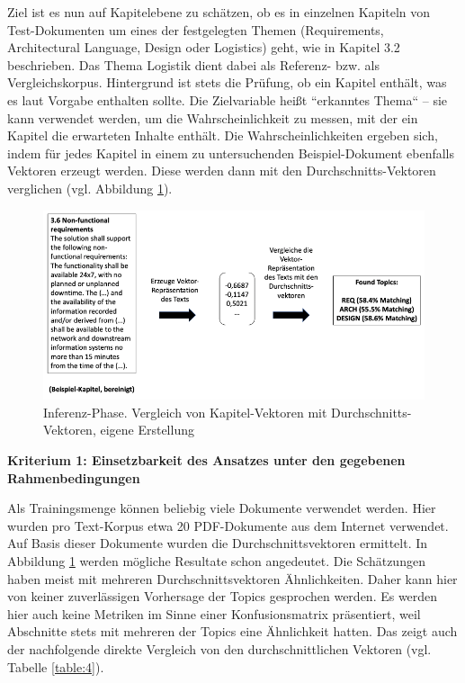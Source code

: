 Ziel ist es nun auf Kapitelebene zu schätzen, ob es in einzelnen Kapiteln von Test-Dokumenten um eines der festgelegten Themen (Requirements, Architectural Language, Design oder Logistics) geht, wie in Kapitel 3.2 beschrieben. Das Thema Logistik dient dabei als Referenz- bzw. als Vergleichskorpus. Hintergrund ist stets die Prüfung, ob ein Kapitel enthält, was es laut Vorgabe enthalten sollte. Die Zielvariable heißt ``erkanntes Thema`` – sie kann verwendet werden, um die Wahrscheinlichkeit zu messen, mit der ein Kapitel die erwarteten Inhalte enthält. Die Wahrscheinlichkeiten ergeben sich, indem für jedes Kapitel in einem zu untersuchenden Beispiel-Dokument ebenfalls Vektoren erzeugt werden. Diese werden dann mit den Durchschnitts-Vektoren verglichen (vgl. Abbildung \ref{Abbildung:avgvec2}). 

\begin{figure}[h]
\centering
\includegraphics[scale=0.95]{content/pics/Picture_17.png}
\caption{Inferenz-Phase. Vergleich von Kapitel-Vektoren mit Durchschnitts-Vektoren, eigene Erstellung}
\label{Abbildung:avgvec2}
\end{figure}

{\bf Kriterium 1: Einsetzbarkeit des Ansatzes unter den gegebenen Rahmenbedingungen}

Als Trainingsmenge können beliebig viele Dokumente verwendet werden. Hier wurden pro Text-Korpus etwa 20 PDF-Dokumente aus dem Internet verwendet. Auf Basis dieser Dokumente wurden die Durchschnittsvektoren ermittelt. 
In Abbildung \ref{Abbildung:avgvec2} werden mögliche Resultate schon angedeutet. Die Schätzungen haben meist mit mehreren Durchschnittsvektoren Ähnlichkeiten. Daher kann hier von keiner zuverlässigen Vorhersage der Topics gesprochen werden. 
Es werden hier auch keine Metriken im Sinne einer Konfusionsmatrix präsentiert, weil Abschnitte stets mit mehreren der Topics eine Ähnlichkeit hatten. Das zeigt auch der nachfolgende direkte Vergleich von den durchschnittlichen Vektoren (vgl. Tabelle \ref{table:4}).

